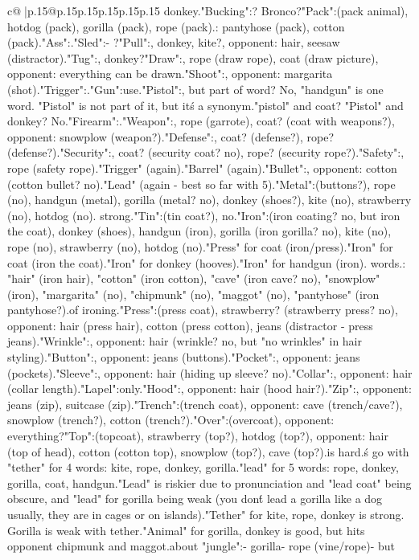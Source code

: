 \documentclass{article}
\begin{document}
{\begin{supertabular}{c@{$\;$}|p{.15\linewidth}@{}p{.15\linewidth}p{.15\linewidth}p{.15\linewidth}p{.15\linewidth}p{.15\linewidth}}
{{{donkey.\n\n"Bucking":\nDonkey? Bronco?\n\n"Pack":\nDonkey (pack animal), hotdog (pack), gorilla (pack), rope (pack).\nOpponents: pantyhose (pack), cotton (pack).\n\n"Ass":\nDonkey.\n\n"Sled":\n- ?\n\n"Pull":\nRope, donkey, kite?, opponent: hair, seesaw (distractor).\n\n"Tug":\nRope, donkey?\n\n"Draw":\nHandgun, rope (draw rope), coat (draw picture), opponent: everything can be drawn.\n\n"Shoot":\nHandgun, opponent: margarita (shot).\n\n"Trigger":\nHandgun.\n\n"Gun":\nCannot use.\n\n"Pistol":\nHandgun, but part of word? No, "handgun" is one word. "Pistol" is not part of it, but it\'s a synonym.\nBut "pistol" and coat? "Pistol" and donkey? No.\n\n"Firearm":\nHandgun.\n\n"Weapon":\nHandgun, rope (garrote), coat? (coat with weapons?), opponent: snowplow (weapon?).\n\n"Defense":\nHandgun, coat? (defense?), rope? (defense?).\n\n"Security":\nHandgun, coat? (security coat? no), rope? (security rope?).\n\n"Safety":\nHandgun, rope (safety rope).\n\n"Trigger" (again).\n\n"Barrel" (again).\n\n"Bullet":\nHandgun, opponent: cotton (cotton bullet? no).\n\n"Lead" (again - best so far with 5).\n\n"Metal":\nCoat (buttons?), rope (no), handgun (metal), gorilla (metal? no), donkey (shoes?), kite (no), strawberry (no), hotdog (no). strong.\n\n"Tin":\nCoat (tin coat?), no.\n\n"Iron":\nCoat (iron coating? no, but iron the coat), donkey (shoes), handgun (iron), gorilla (iron gorilla? no), kite (no), rope (no), strawberry (no), hotdog (no).\n"Press" for coat (iron/press).\n"Iron" for coat (iron the coat).\n"Iron" for donkey (hooves).\n"Iron" for handgun (iron). words.\nOpponent: "hair" (iron hair), "cotton" (iron cotton), "cave" (iron cave? no), "snowplow" (iron), "margarita" (no), "chipmunk" (no), "maggot" (no), "pantyhose" (iron pantyhose?).\nLots of ironing.\n\n"Press":\nCoat (press coat), strawberry? (strawberry press? no), opponent: hair (press hair), cotton (press cotton), jeans (distractor - press jeans).\n\n"Wrinkle":\nCoat, opponent: hair (wrinkle? no, but "no wrinkles" in hair styling).\n\n"Button":\nCoat, opponent: jeans (buttons).\n\n"Pocket":\nCoat, opponent: jeans (pockets).\n\n"Sleeve":\nCoat, opponent: hair (hiding up sleeve? no).\n\n"Collar":\nCoat, opponent: hair (collar length).\n\n"Lapel":\nCoat only.\n\n"Hood":\nCoat, opponent: hair (hood hair?).\n\n"Zip":\nCoat, opponent: jeans (zip), suitcase (zip).\n\n"Trench":\nCoat (trench coat), opponent: cave (trench/cave?), snowplow (trench?), cotton (trench?).\n\n"Over":\nCoat (overcoat), opponent: everything?\n\n"Top":\nCoat (topcoat), strawberry (top?), hotdog (top?), opponent: hair (top of head), cotton (cotton top), snowplow (top?), cave (top?).\n\nThis is hard.\n\nLet\'s go with "tether" for 4 words: kite, rope, donkey, gorilla.\nOr "lead" for 5 words: rope, donkey, gorilla, coat, handgun.\n"Lead" is riskier due to pronunciation and "lead coat" being obscure, and "lead" for gorilla being weak (you don\'t lead a gorilla like a dog usually, they are in cages or on islands).\n"Tether" for kite, rope, donkey is strong. Gorilla is weak with tether.\n"Animal" for gorilla, donkey is good, but hits opponent chipmunk and maggot.\n\nHow about "jungle":\n- gorilla\n- rope (vine/rope)\n- but }}}
\end{supertabular}}
\end{document}
